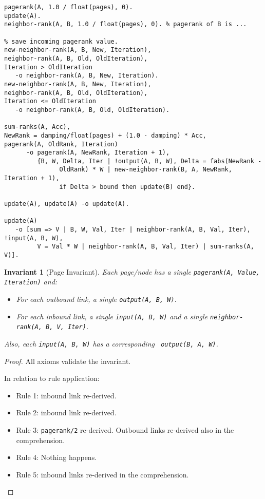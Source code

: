 \documentclass[9pt]{article}
\newtheorem{invariant}{Invariant}
\begin{document}
\begin{verbatim}
pagerank(A, 1.0 / float(pages), 0).
update(A).
neighbor-rank(A, B, 1.0 / float(pages), 0). % pagerank of B is ...

% save incoming pagerank value.
new-neighbor-rank(A, B, New, Iteration),
neighbor-rank(A, B, Old, OldIteration),
Iteration > OldIteration
   -o neighbor-rank(A, B, New, Iteration).
new-neighbor-rank(A, B, New, Iteration),
neighbor-rank(A, B, Old, OldIteration),
Iteration <= OldIteration
   -o neighbor-rank(A, B, Old, OldIteration).

sum-ranks(A, Acc),
NewRank = damping/float(pages) + (1.0 - damping) * Acc,
pagerank(A, OldRank, Iteration)
      -o pagerank(A, NewRank, Iteration + 1),
         {B, W, Delta, Iter | !output(A, B, W), Delta = fabs(NewRank -
               OldRank) * W | new-neighbor-rank(B, A, NewRank, Iteration + 1),
               if Delta > bound then update(B) end}.

update(A), update(A) -o update(A).

update(A)
   -o [sum => V | B, W, Val, Iter | neighbor-rank(A, B, Val, Iter), !input(A, B, W),
         V = Val * W | neighbor-rank(A, B, Val, Iter) | sum-ranks(A, V)].
\end{verbatim}

\begin{invariant}[Page Invariant]
Each page/node has a single \texttt{pagerank(A, Value, Iteration)} and:
\begin{itemize}
   \item For each outbound link, a single \texttt{\bang output(A, B, W)}.
   \item For each inbound link, a single \texttt{\bang input(A, B, W)} and a
   single \texttt{neighbor-rank(A, B, V, Iter)}.
\end{itemize}

Also, each \texttt{\bang input(A, B, W)} has a corresponding \texttt{\bang
   output(B, A, W)}.
\end{invariant}

\begin{proof}
All axioms validate the invariant.

In relation to rule application:

\begin{itemize}
   \item Rule 1: inbound link re-derived.
   \item Rule 2: inbound link re-derived.
   \item Rule 3: \texttt{pagerank/2} re-derived. Outbound links re-derived also
   in the comprehension.
   \item Rule 4: Nothing happens.
   \item Rule 5: inbound links re-derived in the comprehension.
\end{itemize}
\end{proof}
\end{document}
